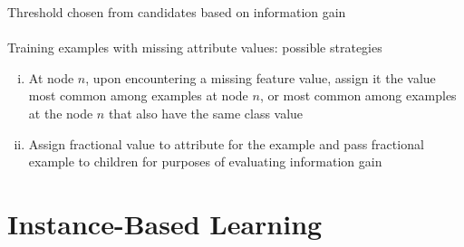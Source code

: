 \documentclass{article}
\begin{document}
		Threshold chosen from candidates based on information gain \\
		\\
		Training examples with missing attribute values: possible strategies
		\begin{enumerate}[(i)]
			\item At node $n$, upon encountering a missing feature value, assign it the value most common among examples at node $n$, or most common among examples at the node $n$ that also have the same class value
			\item Assign fractional value to attribute for the example and pass fractional example to children for purposes of evaluating information gain
			\end{enumerate}
		\clearpage

	\section{Instance-Based Learning}
\end{document}
